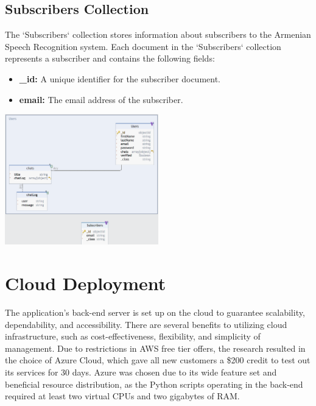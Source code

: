 \documentclass[conference]{IEEEtran}
\begin{document}
\subsection{Subscribers Collection}

The `Subscribers` collection stores information about subscribers to the Armenian Speech Recognition system. Each document in the `Subscribers` collection represents a subscriber and contains the following fields:

\begin{itemize}
    \item \textbf{\_id:} A unique identifier for the subscriber document.
    \item \textbf{email:} The email address of the subscriber.
\end{itemize}

\begin{center}
    \centering
    \includegraphics[width=0.5\textwidth]{DB_Structure.png}
    \label{fig:database_structure}
\end{center}




\section{Cloud Deployment}

The application's back-end server is set up on the cloud to guarantee scalability, dependability, and accessibility. There are several benefits to utilizing cloud infrastructure, such as cost-effectiveness, flexibility, and simplicity of management.
Due to restrictions in AWS free tier offers, the research resulted in the choice of Azure Cloud, which gave all new customers a \$200 credit to test out its services for 30 days. Azure was chosen due to its wide feature set and beneficial resource distribution, as the Python scripts operating in the back-end required at least two virtual CPUs and two gigabytes of RAM.
\end{document}
